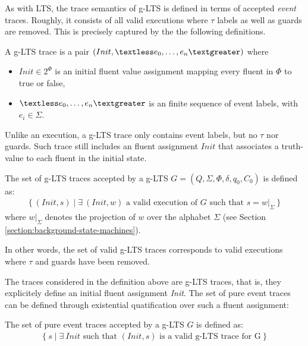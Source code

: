 As with LTS, the trace semantics of g-LTS is defined in terms of accepted \emph{event} traces. Roughly, it consists of all valid executions where $\tau$ labels as well as guards are removed. This is precisely captured by the the following definitions.

\begin{definition}
A g-LTS trace is a pair $(Init,\textless e_0,\ldots,e_n\textgreater)$ where 
\begin{itemize}
\item $Init \in 2^\Phi$ is an initial fluent value assignment mapping every fluent in $\Phi$ to true or false,
\item $\textless e_0,\ldots,e_n \textgreater$ is an finite sequence of event labels, with $e_i \in \Sigma$.
\end{itemize}
\end{definition}

Unlike an execution, a g-LTS trace only contains event labels, but no $\tau$ nor guards. Such trace still includes an fluent assignment $Init$ that associates a truth-value to each fluent in the initial state.

\begin{definition}
The set of g-LTS traces accepted by a g-LTS $G = (Q,\Sigma,\Phi,\delta,q_{0},C_{0})$ is defined as:
\begin{align*}
\{~(Init, s) \mid \exists~(Init, w) \mbox{~a valid execution of $G$ such that~} s = w|_{\Sigma}~\}
\end{align*}
where $w|_{\Sigma}$ denotes the projection of $w$ over the alphabet $\Sigma$ (see Section \ref{section:background-state-machines}).
\end{definition}

In other words, the set of valid g-LTS traces corresponds to valid executions where $\tau$ and guards have been removed. 

The traces considered in the definition above are g-LTS traces, that is, they explicitely define an initial fluent assignment \emph{Init}. The set of pure event traces can be defined through existential quatification over such a fluent assignment:

\begin{definition}
The set of pure event traces accepted by a g-LTS $G$ is defined as:
\begin{align*}
\{~ s \mid \exists~Init \mbox{~such that~} (Init,s) \mbox{~is a valid g-LTS trace for G}~\}
\end{align*}
\label{definition:glts-trace-semantics}
\end{definition}

